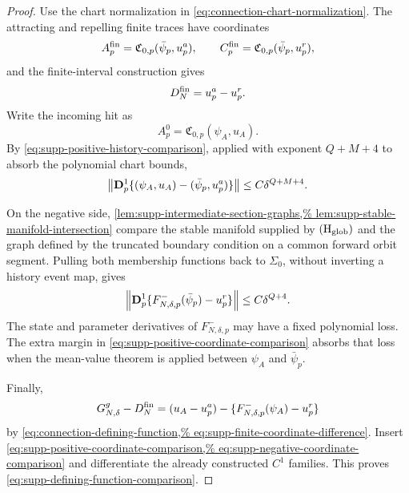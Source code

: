\begin{proof}
Use the chart normalization in
\cref{eq:connection-chart-normalization}.  The attracting and repelling
finite traces have coordinates
\[
 A_p^{\rm fin}=\mathfrak C_{0,p}(\bar\psi_p,u_p^a),
 \qquad
 C_p^{\rm fin}=\mathfrak C_{0,p}(\bar\psi_p,u_p^r),
\]
and the finite-interval construction gives
\begin{equation}
 D_N^{\rm fin}=u_p^a-u_p^r.
 \label{eq:supp-finite-coordinate-difference}
\end{equation}
Write the incoming hit as
\[
 A_p^0=\mathfrak C_{0,p}(\psi_A,u_A).
\]
By \cref{eq:supp-positive-history-comparison}, applied with exponent
\(Q+M+4\) to absorb the polynomial chart bounds,
\begin{equation}
 \left\lVert\mathbf D_p^1
   \{(\psi_A,u_A)-(\bar\psi_p,u_p^a)\}\right\rVert
 \le C\delta^{Q+M+4}.
 \label{eq:supp-positive-coordinate-comparison}
\end{equation}

On the negative side,
\cref{lem:supp-intermediate-section-graphs,%
lem:supp-stable-manifold-intersection} compare the stable manifold supplied by
\(\mathrm{(H_{\rm glob})}\) and the graph defined by the truncated boundary
condition on a common forward orbit segment.  Pulling both
membership functions back to \(\Sigma_0\), without inverting a history
event map, gives
\begin{equation}
 \left\lVert\mathbf D_p^1
   \{F_{N,\delta,p}^-(\bar\psi_p)-u_p^r\}\right\rVert
 \le C\delta^{Q+4}.
 \label{eq:supp-negative-coordinate-comparison}
\end{equation}
The state and parameter derivatives of \(F_{N,\delta,p}^-\) may have a
fixed polynomial loss.  The extra margin in
\cref{eq:supp-positive-coordinate-comparison} absorbs that loss when the
mean-value theorem is applied between \(\psi_A\) and \(\bar\psi_p\).

Finally,
\[
 G_{N,\delta}^{g}-D_N^{\rm fin}
 =(u_A-u_p^a)
  -\{F_{N,\delta,p}^-(\psi_A)-u_p^r\}
\]
by \cref{eq:connection-defining-function,%
eq:supp-finite-coordinate-difference}.  Insert
\cref{eq:supp-positive-coordinate-comparison,%
eq:supp-negative-coordinate-comparison} and differentiate the already
constructed \(C^1\) families.  This proves
\cref{eq:supp-defining-function-comparison}.
\end{proof}
